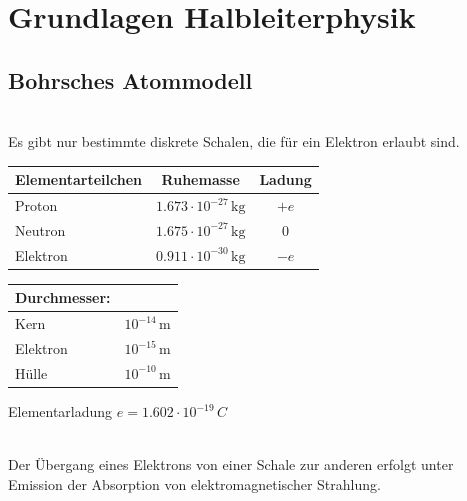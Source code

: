 \section{Grundlagen Halbleiterphysik}

\subsection{Bohrsches Atommodell}

\\
    Es gibt nur bestimmte diskrete Schalen, die für ein Elektron erlaubt sind.

\vspace{0.1cm}

\begin{minipage}[t]{0.6\columnwidth}
    \renewcommand{\arraystretch}{1.5}
    \begin{tabular}{|l|c|c|}
        \hline
        \textbf{Elementarteilchen} & \textbf{Ruhemasse} & \textbf{Ladung} \\
        \hline
        Proton & $1.673 \cdot 10^{-27} \, \text{kg}$ & $+e$ \\
        Neutron & $1.675 \cdot 10^{-27} \, \text{kg}$ & $0$ \\
        Elektron & $0.911 \cdot 10^{-30} \, \text{kg}$ & $-e$ \\
        \hline
    \end{tabular}
\end{minipage}
\hfill
\begin{minipage}[t]{0.36\columnwidth}
    \begin{tabular}{|l c|}
        \hline 
        \textbf{Durchmesser:} & \\
        \hline
        Kern & \(10^{-14} \, \text{m}\) \\
        Elektron & \(10^{-15} \, \text{m}\) \\
        Hülle & \(10^{-10} \, \text{m}\) \\
        \hline
    \end{tabular}
\end{minipage}

Elementarladung $e = 1.602 \cdot 10^{-19} \, C$

\vspace{0.1cm}

\\
Der Übergang eines Elektrons von einer Schale zur anderen erfolgt unter Emission der Absorption von elektromagnetischer Strahlung.

